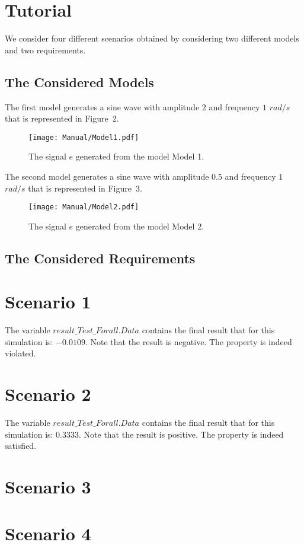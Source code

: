 \documentclass[12pt]{extarticle}
\newcommand{\<}{\langle}
\renewcommand{\>}{\rangle}
\theoremstyle{definition}
\begin{document}
\section{Tutorial}
We consider four different scenarios obtained by considering two different models and two requirements.

\subsection{The Considered Models}
The first model generates a sine wave with amplitude $2$ and frequency $1$ $rad/s$ that is represented in Figure~2.

\begin{figure}
\caption{The signal $e$ generated from the model Model 1.}
  \centering
    \texttt{[image: Manual/Model1.pdf]}
\end{figure}

The second model generates a sine wave with amplitude $0.5$ and frequency $1$ $rad/s$ that is represented in Figure~3.

\begin{figure}
\caption{The signal $e$ generated from the model Model 2.}
  \centering
    \texttt{[image: Manual/Model2.pdf]}
\end{figure}

\subsection{The Considered Requirements}



\section{Scenario 1}

The variable  $result\_Test\_Forall.Data$  contains the final result that for this simulation is: $-0.0109$.
Note that the result is negative. 
The property is indeed violated.

\section{Scenario 2}

The variable $result\_Test\_Forall.Data$ contains the final result that for this simulation is: $0.3333$.
Note that the result is positive.
The property is indeed satisfied.


\section{Scenario 3}

\section{Scenario 4}
\end{document}
